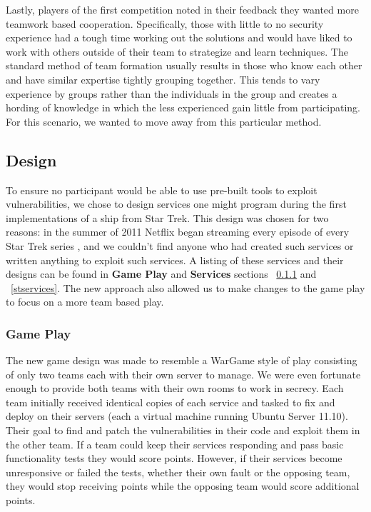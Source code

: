 \documentclass[10pt]{article}
\begin{document}
Lastly, players of the first competition noted in their feedback they wanted
more teamwork based cooperation. Specifically, those with little to no security
experience had a tough time working out the solutions and would have liked to
work with others outside of their team to strategize and learn techniques. The
standard method of team formation usually results in those who know each other
and have similar expertise tightly grouping together. This tends to vary
experience by groups rather than the individuals in the group and creates a
hording of knowledge in which the less experienced gain little from
participating. For this scenario, we wanted to move away from this particular
method.

\subsection{Design}
\label{stdesign}
To ensure no participant would be able to use pre-built tools to exploit
vulnerabilities, we chose to design services one might program during the first
implementations of a ship from Star Trek. This design was chosen
for two reasons: in the summer of 2011 Netflix began streaming every episode of
every Star Trek series \cite{Netflix}, and we couldn't find anyone who
had created such services or written anything to exploit such services. A
listing of these services and their designs can be found in \textbf{Game Play}
and \textbf{Services} sections ~\ref{stgameplay} and ~\ref{stservices}. The new
approach also allowed us to make changes to the game play to focus on a more
team based play.

\subsubsection{Game Play}
\label{stgameplay}
The new game design was made to resemble a WarGame style of play consisting of
only two teams each with their own server to manage. We were even fortunate
enough to provide both teams with their own rooms to work in secrecy. Each team
initially received identical copies of each service and tasked to fix and
deploy on their servers (each a virtual machine running Ubuntu Server 11.10).
Their goal to find and patch the vulnerabilities in their code and exploit them
in the other team. If a team could keep their services responding and pass basic
functionality tests they would score points. However, if their services become
unresponsive or failed the tests, whether their own fault or the opposing team,
they would stop receiving points while the opposing team would score additional
points.
\end{document}
